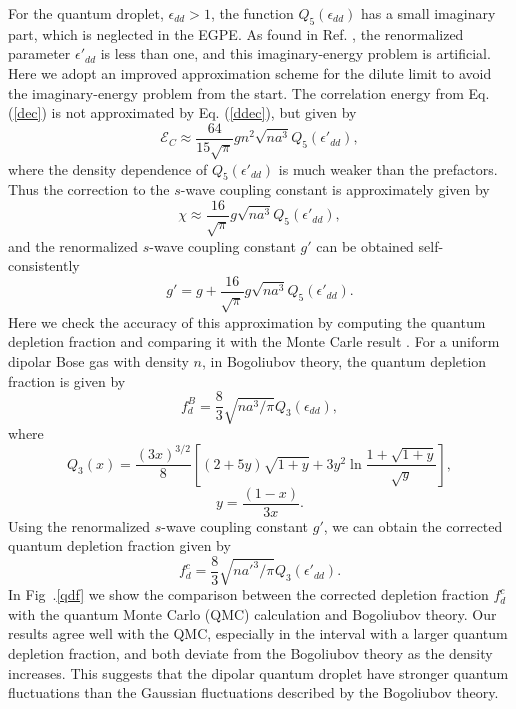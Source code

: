 \documentclass[
reprint, amsmath,amssymb,aps,twocolumn]{revtex4-2}
\begin{document}
For the quantum droplet, $\epsilon_{dd}>1$, the function $Q_5(\epsilon_{dd})$ has a small imaginary part, which is neglected in the EGPE\cite{wachtler2016ground,baillie2016self}.  As found in Ref. \cite{zhang2022phonon}, the renormalized parameter $\epsilon'_{dd}$ is less than one, and this imaginary-energy problem is artificial.  Here we adopt an improved approximation scheme for the dilute limit to avoid the imaginary-energy problem from the start.  The correlation energy from Eq. (\ref{dec}) is not approximated by Eq. (\ref{ddec}), but given by
\begin{equation}
	\mathcal{E}_C \approx \frac{64}{15\sqrt{\pi}}gn^2 \sqrt{n a^3}Q_5(\epsilon'_{dd}),
\end{equation}
where the density dependence of $Q_5(\epsilon'_{dd})$ is much weaker than the prefactors.  Thus the correction to the $s$-wave coupling constant is approximately given by
\begin{equation}
	\chi \approx \frac{16}{\sqrt{\pi}}g \sqrt{n a^3}Q_5(\epsilon'_{dd}),
\end{equation}
and the renormalized $s$-wave coupling constant $g'$ can be obtained self-consistently
\begin{equation}
	g'=g+ \frac{16}{\sqrt{\pi}}g\sqrt{n a^3}Q_5(\epsilon'_{dd}).
\end{equation}
Here we check the accuracy of this approximation by computing the quantum depletion fraction and comparing it with the Monte Carle result \cite{bottcher2019dilute}. For a uniform dipolar Bose gas with density $n$, in Bogoliubov theory, the quantum depletion fraction is given by\cite{lima2012}
\begin{equation}\label{fdb}
	f_d^B=\frac{8}{3}\sqrt{n a^3/\pi}Q_3(\epsilon_{{dd}}),
\end{equation}
where $$Q_3(x)=\frac{(3x)^{3/2}}{8} [(2+5y)\sqrt{1+y}+3y^2\ln\frac{1+\sqrt{1+y}}{\sqrt{y}}],$$$$ y=\frac{(1-x)}{3x}.$$
Using the renormalized $s$-wave coupling constant $g'$, we can obtain the corrected quantum depletion fraction given by
\begin{equation}\label{fdc}
	f_d^c=\frac{8}{3}\sqrt{n a'^3/\pi}Q_3(\epsilon'_{{dd}}).
\end{equation}
In Fig~.\ref{qdf} we show the comparison between the corrected depletion fraction $f^c_d$ with the quantum Monte
Carlo (QMC) calculation \cite{bottcher2019dilute} and Bogoliubov theory. Our results agree well with the QMC, especially in the interval with a larger quantum depletion fraction, and both deviate from the Bogoliubov theory as the density increases. This suggests that the dipolar quantum droplet have stronger quantum fluctuations than the Gaussian fluctuations described by the Bogoliubov theory.
\end{document}
